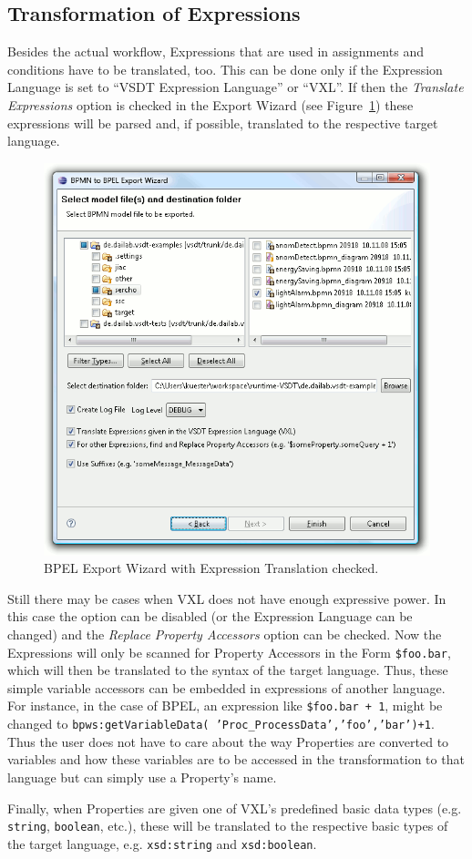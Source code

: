 \subsection{Transformation of Expressions}

Besides the actual workflow, Expressions that are used in assignments and
conditions have to be translated, too.  This can be done only if the Expression
Language is set to ``VSDT Expression Language'' or ``VXL''.  If then the
\emph{Translate Expressions} option is checked in the Export Wizard (see
Figure~\ref{fig:trafo_wiz}) these expressions will be parsed and, if possible,
translated to the respective target language.

\begin{figure}[ht]
	\centering
	\includegraphics[width=.5\textwidth]{figures/features/exportWiz.png}
	\caption{BPEL Export Wizard with Expression Translation checked.}
	\label{fig:trafo_wiz}
\end{figure}

Still there may be cases when VXL does not have enough expressive power.  In this
case the option can be disabled (or the Expression Language can be changed) and
the \emph{Replace Property Accessors} option can be checked.  Now the Expressions
will only be scanned for Property Accessors in the Form \texttt{\$foo.bar}, which
will then be translated to the syntax of the target language.  Thus, these simple
variable accessors can be embedded in expressions of another language.  For instance,
in the case of BPEL, an expression like \texttt{\$foo.bar + 1}, might be changed
to \texttt{bpws:getVariableData( 'Proc\_ProcessData','foo','bar')+1}.  Thus the
user does not have to care about the way Properties are converted to variables
and how these variables are to be accessed in the transformation to that language
but can simply use a Property's name.

Finally, when Properties are given one of VXL's predefined basic data types (e.g.
\texttt{string}, \texttt{boolean}, etc.), these will be translated to the
respective basic types of the target language, e.g. \texttt{xsd:string} and
\texttt{xsd:boolean}.



